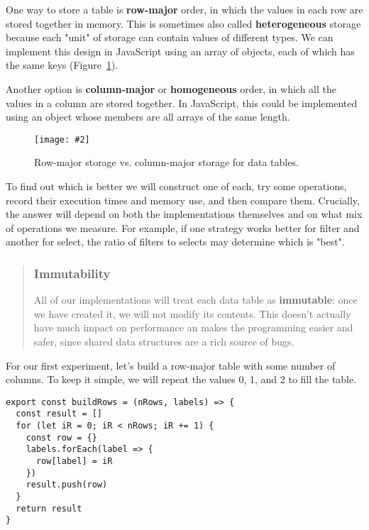 \documentclass[krantzl]{krantz}
\newcommand{\figpdf}[4]{\begin{figure}%
\centering%
\texttt{[image: \#2]}%
\caption{#3}%
\label{#1}%
\end{figure}}
\newcommand{\figref}[1]{Figure~\ref{#1}}
\newcommand{\glossref}[1]{\textbf{#1}}
\newenvironment{callout}{\savenotes\begin{tBox}\begin{quotation}\toggletrue{inbox}\renewcommand{\thempfootnote}{\arabic{footnote}}}{\end{quotation}\vspace{\baselineskip}\end{tBox}\togglefalse{inbox}\spewnotes}
\begin{document}
One way to store a table is \glossref{row-major} order,
in which the values in each row are stored together in memory.
This is sometimes also called \glossref{heterogeneous} storage
because each "unit" of storage can contain values of different types.
We can implement this design in JavaScript using an array of objects,
each of which has the same keys
(\figref{data-table-storage-order}).


Another option is \glossref{column-major}
or \glossref{homogeneous} order,
in which all the values in a column are stored together.
In JavaScript,
this could be implemented using an object
whose members are all arrays of the same length.

\figpdf{data-table-storage-order}{./data-table/storage-order.pdf}{Row-major storage vs. column-major storage for data tables.}{0.6}


To find out which is better
we will construct one of each,
try some operations,
record their execution times and memory use,
and then compare them.
Crucially,
the answer will depend on both the implementations themselves
and on what mix of operations we measure.
For example,
if one strategy works better for filter and another for select,
the ratio of filters to selects may determine which is "best".

\begin{callout}


\subsubsection*{Immutability}


All of our implementations will treat each data table as \glossref{immutable}:
once we have created it,
we will not modify its contents.
This doesn't actually have much impact on performance
an makes the programming easier and safer,
since shared data structures are a rich source of bugs.

\end{callout}


For our first experiment,
let's build a row-major table with some number of columns.
To keep it simple,
we will repeat the values 0, 1, and 2 to fill the table.


\begin{lstlisting}[frame=single,frameround=tttt]
export const buildRows = (nRows, labels) => {
  const result = []
  for (let iR = 0; iR < nRows; iR += 1) {
    const row = {}
    labels.forEach(label => {
      row[label] = iR
    })
    result.push(row)
  }
  return result
}
\end{lstlisting}
\end{document}
